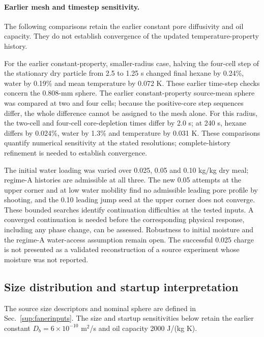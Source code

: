\documentclass[11pt]{article}
\begin{document}
\paragraph{Earlier mesh and timestep sensitivity.}
\label{sup:fanerrefinement}
The following comparisons retain the earlier constant pore diffusivity
and oil capacity. They do not establish convergence of the updated
temperature-property history.

For the earlier constant-property, smaller-radius case, halving the four-cell step of the
stationary dry particle from 2.5 to 1.25 s changed final hexane by 0.24\%,
water by 0.19\% and mean temperature by 0.072 K. These earlier time-step
checks concern the 0.808-mm sphere. The earlier constant-property source-mean sphere was
compared at two and four cells; because the positive-core step sequences
differ, the whole difference cannot be assigned to the mesh alone. For this
radius, the two-cell and four-cell core-depletion times differ by 2.0 s; at
240 s, hexane differs by 0.024\%, water by 1.3\% and temperature by
0.031 K. These comparisons quantify numerical sensitivity at the stated
resolutions; complete-history refinement is needed to establish convergence.

The initial water loading was varied over 0.025, 0.05 and 0.10
kg/kg dry meal; regime-A histories are admissible at all three. The new
0.05 attempts at the upper corner and at low water mobility find no
admissible leading pore profile by shooting, and the 0.10 leading jump seed
at the upper corner does not converge. These bounded searches identify continuation difficulties at the tested
inputs. A converged continuation is needed before the corresponding
physical response, including any phase change, can be assessed. Robustness to initial moisture and the regime-A
water-access assumption remain open. The successful 0.025 charge is not
presented as a validated reconstruction of a source experiment whose
moisture was not reported.


\subsection{Size distribution and startup interpretation}
\label{sup:fanersizes}
The source size descriptors and nominal sphere are defined in
Sec.~\ref{sup:fanerinputs}. The size and startup sensitivities below retain
the earlier constant $D_b=6\times10^{-10}$ m$^2$/s and oil capacity
2000 J/(kg K).
\end{document}
